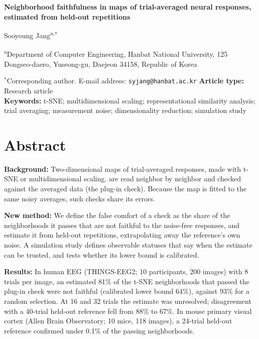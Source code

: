 \documentclass[11pt]{article}
\newcommand{\MsTitle}{Neighborhood faithfulness in maps of trial-averaged neural responses, estimated from held-out repetitions}
\newcommand{\EegLeight}{64}
\newcommand{\EegFCeightSmaller}{81}
\newcommand{\EegDEight}{88}
\newcommand{\EegDThirtyTwo}{67}
\newcommand{\EegRandEight}{93}
\begin{document}
\onehalfspacing

\begin{center}
{\Large\bfseries \MsTitle\par}
\vspace{1.5em}
{\large Sooyoung Jang\textsuperscript{a,}$^{\ast}$\par}
\vspace{0.8em}
\textsuperscript{a}Department of Computer Engineering, Hanbat National University, 125 Dongseo-daero, Yuseong-gu, Daejeon 34158, Republic of Korea\par
\end{center}
\vspace{1.2em}
\noindent$^{\ast}$Corresponding author.
E-mail address: \texttt{syjang@hanbat.ac.kr}
\vfill
\noindent\textbf{Article type:} Research article\\[2pt]
\textbf{Keywords:} t-SNE; multidimensional scaling; representational similarity analysis; trial averaging; measurement noise; dimensionality reduction; simulation study
\vfill
\clearpage

\section*{Abstract}
\noindent\textbf{Background:} Two-dimensional maps of trial-averaged responses, made with t-SNE or multidimensional scaling, are read neighbor by neighbor and checked against the averaged data (the plug-in check).
Because the map is fitted to the same noisy averages, such checks share its errors.

\noindent\textbf{New method:} We define the false comfort of a check as the share of the neighborhoods it passes that are not faithful to the noise-free responses, and estimate it from held-out repetitions, extrapolating away the reference's own noise.
A simulation study defines observable statuses that say when the estimate can be trusted, and tests whether its lower bound is calibrated.

\noindent\textbf{Results:} In human EEG (THINGS-EEG2; 10 participants, 200 images) with 8 trials per image, an estimated \EegFCeightSmaller\% of the t-SNE neighborhoods that passed the plug-in check were not faithful (calibrated lower bound \EegLeight\%), against \EegRandEight\% for a random selection.
At 16 and 32 trials the estimate was unresolved; disagreement with a 40-trial held-out reference fell from \EegDEight\% to \EegDThirtyTwo\%.
In mouse primary visual cortex (Allen Brain Observatory; 10 mice, 118 images), a 24-trial held-out reference confirmed under 0.1\% of the passing neighborhoods.
\end{document}

